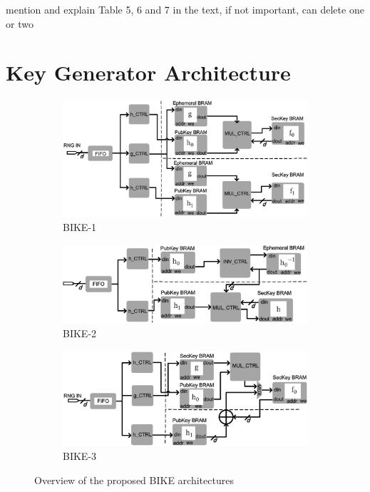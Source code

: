 \documentclass[runningheads]{llncs}
\begin{document}
{\color{red} mention and explain Table 5, 6 and 7 in the text, if not important,
can delete one or two}


\section{Key Generator Architecture}
\label{sec::keygen}

\begin{figure}[!tb]
\centering
\begin{subfigure}[t]{0.47\textwidth}\centering
\includegraphics[width=\textwidth]{./fig/BIKE-1.eps}
\caption{BIKE-1}
\label{fig:bike1}
\end{subfigure}
\hspace{1em}
\begin{subfigure}[t]{0.47\textwidth}\centering
\includegraphics[width=\textwidth]{./fig/BIKE-2.eps}
\caption{BIKE-2 }
\label{fig:bike2}
\end{subfigure}
\begin{subfigure}[t]{0.47\textwidth}\centering
\includegraphics[width=\textwidth]{./fig/BIKE-3.eps}
\caption{BIKE-3 }
\label{fig:bike3}
\end{subfigure}
\caption{Overview of the proposed BIKE architectures}
\end{figure}
\end{document}
